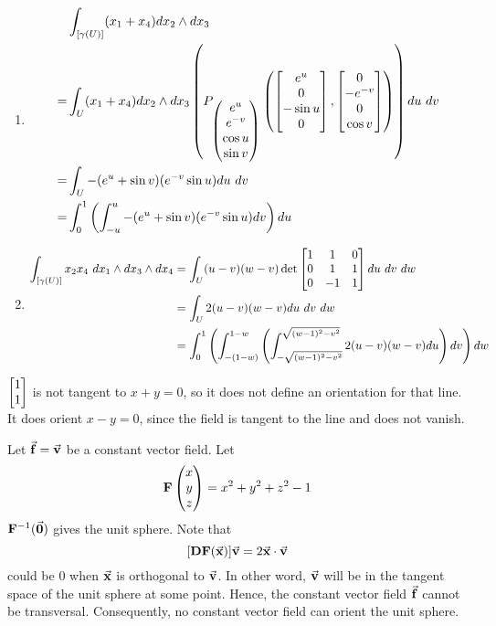 \documentclass{homework}
\begin{document}
\begin{problem}{3}
  \begin{enumerate}
    \item
    \begin{align*} &
      \int_{[\gamma(U)]} (x_1+x_4) dx_2 \land dx_3 \\ =&
      \int_U (x_1+x_4) dx_2 \land dx_3
        \left( P_{\begin{pmatrix}e^u \\ e^{-v} \\ \cos u \\ \sin v\end{pmatrix}}
          \left(
            \begin{bmatrix}e^u \\ 0       \\ -\sin u \\      0\end{bmatrix},
            \begin{bmatrix}0   \\ -e^{-v} \\ 0       \\ \cos v\end{bmatrix}
          \right)
        \right) du\ dv \\ =&
      \int_U -(e^u + \sin v)(e^{-v} \sin u) du\ dv \\ =&
      \int_0^1 \left(
        \int_{-u}^u -(e^u + \sin v)(e^{-v} \sin u) dv
      \right) du
    \end{align*}
    \item
    \begin{align*}
      \int_{[\gamma(U)]} x_2x_4\ dx_1 \land dx_3 \land dx_4 &=
      \int_U (u-v)(w-v) \det
        \begin{bmatrix}1 & 1 & 0 \\ 0 & 1 & 1 \\ 0 & -1 & 1\end{bmatrix} du\ dv\ dw \\ &=
      \int_U 2(u-v)(w-v) du\ dv\ dw \\ &=
      \int_0^1 \left(
        \int_{-(1-w)}^{1-w} \left(
          \int_{-\sqrt{(w-1)^2-v^2}}^{\sqrt{(w-1)^2-v^2}}
            2(u-v)(w-v) du
        \right) dv
      \right) dw
    \end{align*}
  \end{enumerate}
\end{problem}

\begin{problem}{4}
  $\begin{bmatrix}1 \\ 1\end{bmatrix}$ is not tangent to $x + y = 0$, so it does not define an
  orientation for that line. It does orient $x - y = 0$, since the field is
  tangent to the line and does not vanish.
\end{problem}

\begin{problem}{5}
  Let $\vec{\mathbf{f}} = \vec{\mathbf{v}}$ be a constant vector field. Let
  $$\mathbf{F} \begin{pmatrix}x \\ y \\ z\end{pmatrix} = x^2 + y^2 + z^2 - 1$$
  $\mathbf{F}^{-1}(\vec{\mathbf{0}})$ gives the unit sphere. Note that
  $$[\mathbf{DF}(\vec{\mathbf{x}})]\vec{\mathbf{v}} = 2\vec{\mathbf{x}} \cdot \vec{\mathbf{v}}$$
  could be $0$ when $\vec{\mathbf{x}}$ is orthogonal to $\vec{\mathbf{v}}$. In other word,
  $\vec{\mathbf{v}}$ will be in the tangent space of the unit sphere at some point.
  Hence, the constant vector field $\vec{\mathbf{f}}$ cannot be transversal.
  Consequently, no constant vector field can orient the unit sphere. \QED
\end{problem}
\end{document}

